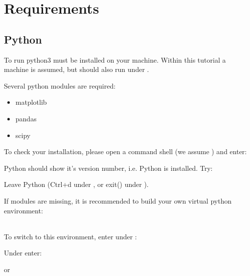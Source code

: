 

\renewcommand*\thesection{\Roman{section}}
\section{Requirements}

\Large

\subsection{Python}

To run \pB python3 must be installed on your machine. Within this tutorial
a \Lin machine is assumed, but \pB should also run under \Wine.

Several python modules are required:

\begin{itemize}
\item matplotlib
\item pandas
\item scipy
\end{itemize}

To check your installation, please open a command shell (we assume \bash) and enter:


Python should show it's version number, i.e. Python is installed. Try:


Leave Python (Ctrl+d under \Lin, or exit() under \Win).

If modules are missing, it is recommended to build your own virtual
python environment:

\\

To switch to this environment, enter under \Lin:


Under \Win enter:


or


